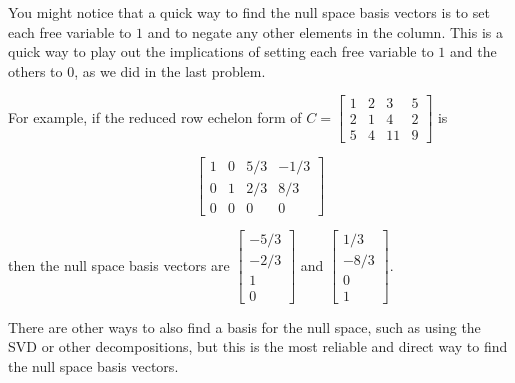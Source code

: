 \documentclass{ximera}
\begin{document}
\begin{remark}

    You might notice that a quick way to find the null space basis vectors is to set each free variable to $1$ and to negate any other elements in the column. This is a quick way to play out the implications of setting each free variable to $1$ and the others to $0$, as we did in the last problem.

    For example, if the reduced row echelon form of $C=\begin{bmatrix} 1 & 2 & 3 & 5 \\ 2 & 1 & 4 &2 \\ 5 & 4 & 11 & 9 \end{bmatrix}$ is 

    $$\begin{bmatrix} 1 & 0 & 5/3 & -1/3 \\ 0 & 1 & 2/3 & 8/3 \\ 0 & 0 & 0 & 0 \end{bmatrix}$$

    then the null space basis vectors are $\begin{bmatrix} -5/3 \\ -2/3 \\ 1 \\ 0 \end{bmatrix}$ and $\begin{bmatrix} 1/3 \\ -8/3 \\ 0 \\ 1 \end{bmatrix}$.

    There are other ways to also find a basis for the null space, such as using the SVD or other decompositions, but this is the most reliable and direct way to find the null space basis vectors.

\end{remark}
\end{document}

